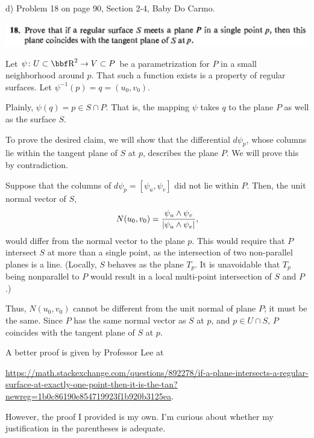 \documentclass[10pt,letterpaper]{hmcpset}
\begin{document}
\newpage
\begin{problem}
d) Problem 18 on page 90, Section 2-4, Baby Do Carmo.

\includegraphics[scale=0.7]{Cd.png}
\end{problem}
\begin{solution}

Let $\psi \colon U \subset \RR^2 \to V \subset P$ be a parametrization for $P$ in a small neighborhood around $p$. That such a function exists is a property of regular surfaces. Let $\psi^{-1}(p) = q = (u_0, v_0)$.

Plainly, $\psi(q) = p \in S \cap P$. That is, the mapping $\psi$ takes $q$ to the plane $P$ as well as the surface $S$.

To prove the desired claim, we will show that the differential $d\psi_p$, whose columns lie within the tangent plane of $S$ at $p$, describes the plane $P$. We will prove this by contradiction.

Suppose that the columns of $d\psi_p = [\psi_u,\psi_v]$ did not lie within $P$. Then, the unit normal vector of $S$,
\[
N(u_0,v_0) = \frac{\psi_u \wedge \psi_v}{\left\lvert\psi_u \wedge \psi_v\right\rvert},
\]
would differ from the normal vector to the plane $p$. This would require that $P$ intersect $S$ at more than a single point, as the intersection of two non-parallel planes is a line. (Locally, $S$ behaves as the plane $T_p$. It is unavoidable that $T_p$ being nonparallel to $P$ would result in a local multi-point intersection of $S$ and $P$.)

Thus, $N(u_0, v_0)$ cannot be different from the unit normal of plane $P$; it must be the same. Since $P$ has the same normal vector as $S$ at $p$, and $p \in U \cap S$, $P$ coincides with the tangent plane of $S$ at $p$.

A better proof is given by Professor Lee at

\href{https://math.stackexchange.com/questions/892278/if-a-plane-intersects-a-regular-surface-at-exactly-one-point-then-it-is-the-tan?newreg=1b0c86190e854719923f1b920b3125ea}{https://math.stackexchange.com/questions/892278/if-a-plane-intersects-a-regular-surface-at-exactly-one-point-then-it-is-the-tan?newreg=1b0c86190e854719923f1b920b3125ea}. 

However, the proof I provided is my own. I'm curious about whether my justification in the parentheses is adequate.

\end{solution}
\end{document}
